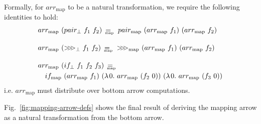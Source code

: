 \documentclass[preprint]{sigplanconf}
\newcommand{\arrowarr}{\ensuremath{arr}}
\newcommand{\arrowcomp}{\ensuremath{{>}\mspace{-6mu}{>}\mspace{-6mu}{>}}}
\newcommand{\arrowpair}{\ensuremath{pair}}
\newcommand{\arrowif}{\ensuremath{if}}
\newcommand{\compbot}{\arrowcomp_\bot}
\newcommand{\pairbot}{\arrowpair_\bot}
\newcommand{\ifbot}{\arrowif_\bot}
\newcommand{\map}{_\mathrm{map}}
\DeclareMathOperator{\eqmap}{\mbox{\ensuremath{=_{\mspace{-19mu}\map}}}}
\newcommand{\arrmap}{\arrowarr\map}
\newcommand{\compmap}{\arrowcomp\map}
\newcommand{\pairmap}{\arrowpair\map}
\newcommand{\ifmap}{\arrowif\map}
\begin{document}
Formally, for $\arrmap$ to be a natural transformation, we require the following identities to hold:
\begin{align}
	&\begin{aligned}
		\arrmap~(\pairbot~f_1~f_2) \ \eqmap \ \pairmap~(\arrmap~f_1)~(\arrmap~f_2)
	\label{eqn:arrmap-distributes-over-pair}
	\end{aligned} \\
\nonumber \\[-6pt]
	&\begin{aligned}
		\arrmap~(\compbot~f_1~f_2) \ \eqmap \ \compmap~(\arrmap~f_1)~(\arrmap~f_2)
	\label{eqn:arrmap-distributes-over-comp}
	\end{aligned} \\
\nonumber \\[-6pt]
	&\begin{aligned}
		&\arrmap~(\ifbot~f_1~f_2~f_3) \ \eqmap \ \\
		&\tab\ifmap~(\arrmap~f_1)~(\fun{0}{\arrmap~(f_2~0)})~(\fun{0}{\arrmap~(f_3~0)})
	\label{eqn:arrmap-distributes-over-if}
	\end{aligned}
\end{align}
i.e. $\arrmap$ must distribute over bottom arrow computations.

Fig.~\ref{fig:mapping-arrow-defs} shows the final result of deriving the mapping arrow as a natural transformation from the bottom arrow.
\end{document}
